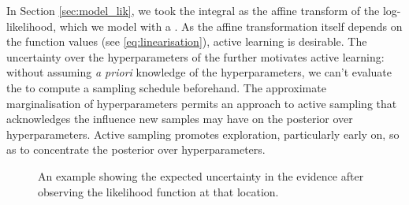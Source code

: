 \documentclass{article}
\begin{document}
In Section \ref{sec:model_lik}, we took the integral as the affine transform of the log-likelihood, which we model with a \gp. As the affine transformation itself depends on the function values (see \eqref{eq:linearisation}), active learning is  desirable. The uncertainty over the hyperparameters of the \gpb further motivates active learning: without assuming \textit{a priori} knowledge of the hyperparameters, we can't evaluate the \gpb to compute a sampling schedule beforehand. The approximate marginalisation of hyperparameters permits an approach to active sampling that acknowledges the influence new samples may have on the posterior over hyperparameters. Active sampling promotes exploration, particularly early on, so as to concentrate the posterior over hyperparameters. 

 \begin{figure}
 \centering
{}
 \caption{An example showing the expected uncertainty in the evidence after observing the likelihood function at that location.}
 \label{fig:eue}
 \end{figure}
 
% 
\end{document}
